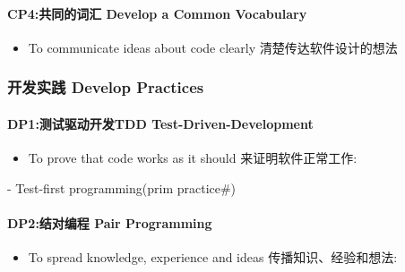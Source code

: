 \documentclass{book}        %
\providecommand{\tightlist}{%
  \setlength{\itemsep}{0pt}\setlength{\parskip}{0pt}}
\let\oldparagraph\paragraph
\renewcommand{\paragraph}[1]{\oldparagraph{#1}\mbox{}}
\begin{document}
\hypertarget{cp4ux5171ux540cux7684ux8bcdux6c47-develop-a-common-vocabulary}{%
\paragraph{CP4:共同的词汇 Develop a Common
Vocabulary}\label{cp4ux5171ux540cux7684ux8bcdux6c47-develop-a-common-vocabulary}}

\begin{itemize}
\tightlist
\item
  To communicate ideas about code clearly 清楚传达软件设计的想法
\end{itemize}

\hypertarget{ux5f00ux53d1ux5b9eux8df5-develop-practices}{%
\subsubsection{开发实践 Develop
Practices}\label{ux5f00ux53d1ux5b9eux8df5-develop-practices}}

\hypertarget{dp1ux6d4bux8bd5ux9a71ux52a8ux5f00ux53d1tdd-test-driven-development}{%
\paragraph{DP1:测试驱动开发TDD
Test-Driven-Development}\label{dp1ux6d4bux8bd5ux9a71ux52a8ux5f00ux53d1tdd-test-driven-development}}

\begin{itemize}
\tightlist
\item
  To prove that code works as it should 来证明软件正常工作:\\
\end{itemize}

\begin{description}
\tightlist
\item[]
- Test-first programming(prim practice\#)
\end{description}

\hypertarget{dp2ux7ed3ux5bf9ux7f16ux7a0b-pair-programming}{%
\paragraph{DP2:结对编程 Pair
Programming}\label{dp2ux7ed3ux5bf9ux7f16ux7a0b-pair-programming}}

\begin{itemize}
\tightlist
\item
  To spread knowledge, experience and ideas 传播知识、经验和想法:\\
\end{itemize}
\end{document}

